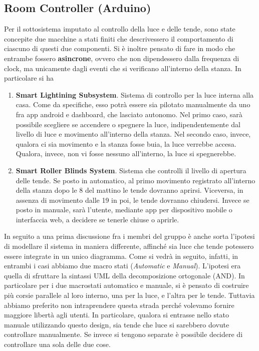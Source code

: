 \documentclass[a4paper,12pt]{report}
\begin{document}
\subsection{Room Controller (Arduino)}
Per il sottosistema imputato al controllo della luce e delle tende, sono state concepite due macchine a stati finiti che descrivessero il comportamento di ciascuno di questi due componenti. Si è inoltre pensato di fare in modo che entrambe fossero \textbf{asincrone}, ovvero che non dipendessero dalla frequenza di clock, ma unicamente dagli eventi che si verificano all'interno della stanza. In particolare si ha
\begin{enumerate}
    \item \textbf{Smart Lightining Subsystem}. Sistema di controllo per la luce interna alla casa. Come da specifiche, esso potrà essere sia pilotato manualmente da uno fra app android e dashboard, che lasciato autonomo. Nel primo caso, sarà possibile scegliere se accendere o spegnere la luce, indipendentemente dal livello di luce e movimento all'interno della stanza. Nel secondo caso, invece, qualora ci sia movimento e la stanza fosse buia, la luce verrebbe accesa. Qualora, invece, non vi fosse nessuno all'interno, la luce si spegnerebbe.
    \item \textbf{Smart Roller Blinds System}. Sistema che controlli il livello di apertura delle tende. Se posto in automatico, al primo movimento registrato all'interno della stanza dopo le 8 del mattino le tende dovranno aprirsi. Viceversa, in assenza di movimento dalle 19 in poi, le tende dovranno chiudersi. Invece se posto in manuale, sarà l'utente, mediante app per dispositivo mobile o interfaccia web, a decidere se tenerle chiuse o aprirle.
\end{enumerate}

In seguito a una prima discussione fra i membri del gruppo è anche sorta l'ipotesi di modellare il sistema in maniera differente, affinché sia luce che tende potessero essere integrate in un unico diagramma. Come si vedrà in seguito, infatti, in entrambi i casi abbiamo due macro stati (\emph{Automatic} e \emph{Manual}). L'ipotesi era quella di sfruttare la sintassi UML della decomposizione ortogonale (AND). In particolare per i due macrostati automatico e manuale, si è pensato di costruire più corsie parallele al loro interno, una per la luce, e l'altra per le tende. Tuttavia abbiamo preferito non intraprendere questa strada perché volevamo fornire maggiore libertà agli utenti. In particolare, qualora si entrasse nello stato manuale utilizzando questo design, sia tende che luce si sarebbero dovute controllare manualmente. Se invece si tengono separate è possibile decidere di controllare una sola delle due cose. 
\end{document}
